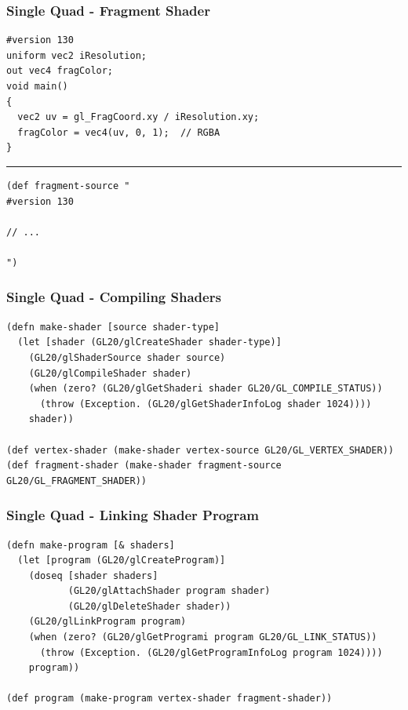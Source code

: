 \documentclass[aspectratio=169,11pt,xcolor=dvipsnames]{beamer}
\begin{document}
\begin{frame}[fragile]
  \frametitle{Single Quad {-} Fragment Shader}
  \begin{verbatim}
#version 130
uniform vec2 iResolution;
out vec4 fragColor;
void main()
{
  vec2 uv = gl_FragCoord.xy / iResolution.xy;
  fragColor = vec4(uv, 0, 1);  // RGBA
}
  \end{verbatim}
  \rule{\textwidth}{1pt}
  \begin{verbatim}
(def fragment-source "
#version 130

// ...

")
  \end{verbatim}
\end{frame}

\begin{frame}[fragile]
  \frametitle{Single Quad {-} Compiling Shaders}
  \begin{verbatim}
(defn make-shader [source shader-type]
  (let [shader (GL20/glCreateShader shader-type)]
    (GL20/glShaderSource shader source)
    (GL20/glCompileShader shader)
    (when (zero? (GL20/glGetShaderi shader GL20/GL_COMPILE_STATUS))
      (throw (Exception. (GL20/glGetShaderInfoLog shader 1024))))
    shader))

(def vertex-shader (make-shader vertex-source GL20/GL_VERTEX_SHADER))
(def fragment-shader (make-shader fragment-source GL20/GL_FRAGMENT_SHADER))
  \end{verbatim}
\end{frame}

\begin{frame}[fragile]
  \frametitle{Single Quad {-} Linking Shader Program}
  \begin{verbatim}
(defn make-program [& shaders]
  (let [program (GL20/glCreateProgram)]
    (doseq [shader shaders]
           (GL20/glAttachShader program shader)
           (GL20/glDeleteShader shader))
    (GL20/glLinkProgram program)
    (when (zero? (GL20/glGetProgrami program GL20/GL_LINK_STATUS))
      (throw (Exception. (GL20/glGetProgramInfoLog program 1024))))
    program))

(def program (make-program vertex-shader fragment-shader))
  \end{verbatim}
\end{frame}
\end{document}
